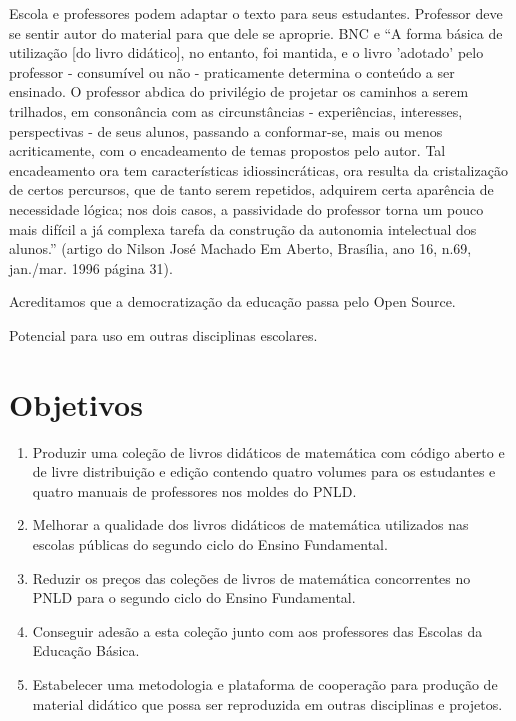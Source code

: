 \documentclass[10 pt]{article}
\begin{document}
Escola e professores podem adaptar o texto para seus estudantes.
Professor deve se sentir autor do material para que dele se aproprie.
BNC e ``A forma básica de utilização [do livro didático], no entanto, foi mantida, e o livro 'adotado' pelo professor - consumível ou não - praticamente determina o conteúdo a ser ensinado.
O professor abdica do privilégio de projetar os caminhos a serem trilhados, em consonância com as circunstâncias - experiências, interesses, perspectivas - de seus alunos, passando a conformar-se, mais ou menos acriticamente, com o encadeamento de temas propostos pelo autor.
Tal encadeamento ora tem características idiossincráticas, ora resulta da cristalização de certos percursos, que de tanto serem repetidos, adquirem certa aparência de necessidade lógica; nos dois casos, a passividade do professor torna um pouco mais difícil a já complexa tarefa da construção da autonomia intelectual dos alunos.''
(artigo do Nilson José Machado Em Aberto, Brasília, ano 16, n.69, jan./mar.
1996 página 31).


Acreditamos que a democratização da educação passa pelo Open Source.

Potencial para uso em outras disciplinas escolares.



\section{Objetivos}

\begin{enumerate}
\item Produzir uma coleção de livros didáticos de matemática com código aberto e de livre distribuição e edição contendo quatro volumes para os estudantes e quatro manuais de professores nos moldes do PNLD.
\item Melhorar a qualidade dos livros didáticos de matemática utilizados nas escolas públicas do segundo ciclo do Ensino Fundamental.
\item Reduzir os preços das coleções de livros de matemática concorrentes no PNLD para o segundo ciclo do Ensino Fundamental.
\item Conseguir adesão a esta coleção junto com aos professores das Escolas da Educação Básica.
\item Estabelecer uma metodologia e plataforma de cooperação para produção de material didático que possa ser reproduzida em outras disciplinas e projetos.
\end{enumerate}
\end{document}

